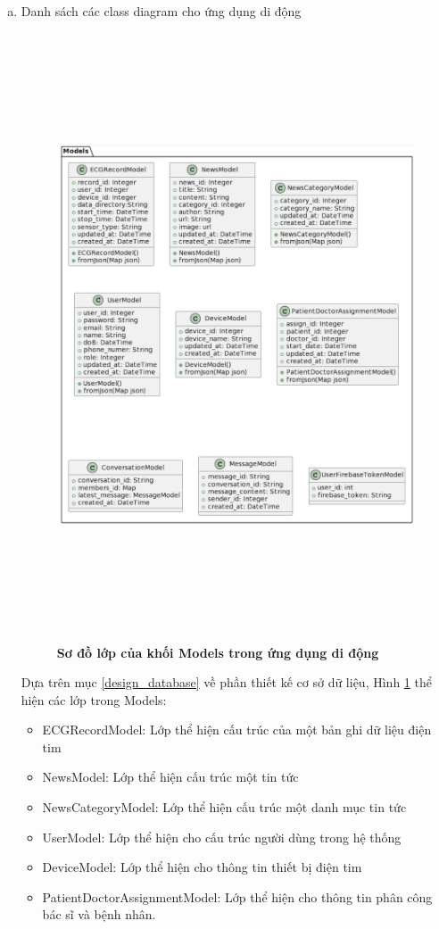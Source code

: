 \begin{enumerate}[a)]
  \item Danh sách các class diagram cho ứng dụng di động
    
  \begin{figure}[H]
    \centering
    \includegraphics[width=16cm,height=18cm]{Images/mobile_app/class_diagram/mobile_class_model.png}
    \caption[Sơ đồ lớp của khối Models trong ứng dụng di động]{\bfseries \fontsize{12pt}{0pt}\selectfont Sơ đồ lớp của khối Models trong ứng dụng di động}
    \label{mobile_class_model} %
  \end{figure}

  Dựa trên mục \ref{design_database} về phần thiết kế cơ sở dữ liệu, Hình \ref{mobile_class_model} thể hiện các lớp trong Models:
  \begin{itemize}
    \item ECGRecordModel: Lớp thể hiện cấu trúc của một bản ghi dữ liệu điện tim
    \item NewsModel: Lớp thể hiện cấu trúc một tin tức
    \item NewsCategoryModel: Lớp thể hiện cấu trúc một danh mục tin tức
    \item UserModel: Lớp thể hiện cho cấu trúc người dùng trong hệ thống
    \item DeviceModel: Lớp thể hiện cho thông tin thiết bị điện tim 
    \item PatientDoctorAssignmentModel: Lớp thể hiện cho thông tin phân công bác sĩ và bệnh nhân.
  \end{itemize}


\end{enumerate}
